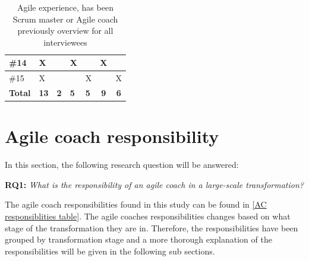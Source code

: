 \documentclass[11pt,a4paper]{report}
\begin{document}
\begin{table}[!ht]
\begin{tabular}{|p{1.5cm}|p{3cm}|p{3cm}|p{2cm}|p{2.3cm}|c|c|}
\centering\#14   &     \centering     X                  &                           &   \centering  X        &     &X&         \\\hline
\centering\#15   &    \centering       X                 &                           &             &      \centering  X    && X  \\\hline
\textbf{Total} &      \centering      \textbf{13}                &       \centering    \textbf{2}                &  \centering  \textbf{5}         &  \centering   \textbf{5} & \centering \textbf{9} & \textbf{6} \\\hline   
\end{tabular}
\caption{Agile experience, has been Scrum master or Agile coach previously overview for all interviewees}
\label{AC background table}
\end{table}
\restoregeometry

\section{Agile coach responsibility}
\label{AC responsibility}
In this section, the following research question will be answered:
\newline

\textbf{RQ1:} \emph{What is the responsibility of an agile coach in a large-scale transformation?}
\newline

\noindent The agile coach responsibilities found in this study can be found in \autoref{AC responsiblities table}. The agile coaches responsibilities changes based on what stage of the transformation they are in. Therefore, the responsibilities have been grouped by transformation stage and a more thorough explanation of the responsibilities will be given in the following sub sections.
\end{document}
